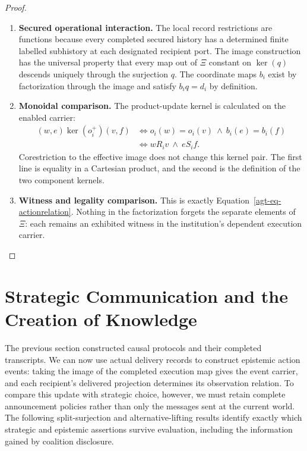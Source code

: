 \documentclass[11pt,a4paper]{article}
\numberwithin{equation}{section}
\theoremstyle{definition}
\theoremstyle{remark}
\theoremstyle{plain}
\providecommand{\kerpair}{\mathop{\mathrm{ker}}}
\begin{document}
\begin{proof}
\leavevmode
\begin{enumerate}[label=\textup{(\arabic*)},leftmargin=*,itemsep=4pt,topsep=3pt]
  \item \textbf{Secured operational interaction.} The local record restrictions are functions because every completed
secured history has a determined finite labelled subhistory at each
designated recipient port. The image construction has the universal
property that every map out of $\Xi$ constant on $\kerpair(q)$
descends uniquely through the surjection $q$. The coordinate maps
$b_i$ exist by factorization through the image and satisfy
$b_iq=d_i$ by definition.
  \item \textbf{Monoidal comparison.} The product-update kernel is calculated on the enabled carrier:
\begin{align*}
 (w,e)\mathrel{\kerpair(o_i^+)}(v,f)
 &\Longleftrightarrow o_i(w)=o_i(v)\ \wedge\ b_i(e)=b_i(f)\\
 &\Longleftrightarrow wR_iv\ \wedge\ eS_if.
\end{align*}
Corestriction to the effective image does not change this kernel pair. The first line is equality in a Cartesian product, and the second is
the definition of the two component kernels.
  \item \textbf{Witness and legality comparison.} This is exactly
Equation~\eqref{agt-eq-actionrelation}. Nothing in the factorization
forgets the separate elements of $\Xi$: each remains an exhibited
witness in the institution's dependent execution carrier.
\end{enumerate}
\end{proof}


\section{Strategic Communication and the Creation of Knowledge}\label{sec:paper-11}

The previous section constructed causal protocols and their
completed transcripts. We can now use actual delivery records to
construct epistemic action events: taking the image of the completed
execution map gives the event carrier, and each recipient's delivered
projection determines its observation relation. To compare this update
with strategic choice, however, we must retain complete announcement
policies rather than only the messages sent at the current world.
The following split-surjection and alternative-lifting results identify
exactly which strategic and epistemic assertions survive evaluation,
including the information gained by coalition disclosure.
\end{document}
